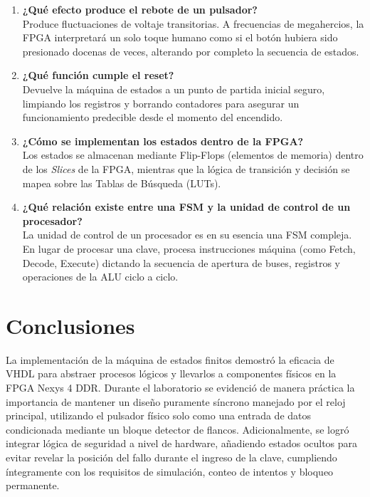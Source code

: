 \documentclass[letterpaper,12pt]{article}
\begin{document}
\begin{enumerate}
    \item \textbf{¿Qué efecto produce el rebote de un pulsador?}\\
    Produce fluctuaciones de voltaje transitorias. A frecuencias de megahercios, la FPGA interpretará un solo toque humano como si el botón hubiera sido presionado docenas de veces, alterando por completo la secuencia de estados.
    
    \item \textbf{¿Qué función cumple el reset?}\\
    Devuelve la máquina de estados a un punto de partida inicial seguro, limpiando los registros y borrando contadores para asegurar un funcionamiento predecible desde el momento del encendido.
    
    \item \textbf{¿Cómo se implementan los estados dentro de la FPGA?}\\
    Los estados se almacenan mediante Flip-Flops (elementos de memoria) dentro de los \textit{Slices} de la FPGA, mientras que la lógica de transición y decisión se mapea sobre las Tablas de Búsqueda (LUTs).
    
    \item \textbf{¿Qué relación existe entre una FSM y la unidad de control de un procesador?}\\
    La unidad de control de un procesador es en su esencia una FSM compleja. En lugar de procesar una clave, procesa instrucciones máquina (como Fetch, Decode, Execute) dictando la secuencia de apertura de buses, registros y operaciones de la ALU ciclo a ciclo.
\end{enumerate}

\section{Conclusiones}
La implementación de la máquina de estados finitos demostró la eficacia de VHDL para abstraer procesos lógicos y llevarlos a componentes físicos en la FPGA Nexys 4 DDR. Durante el laboratorio se evidenció de manera práctica la importancia de mantener un diseño puramente síncrono manejado por el reloj principal, utilizando el pulsador físico solo como una entrada de datos condicionada mediante un bloque detector de flancos. Adicionalmente, se logró integrar lógica de seguridad a nivel de hardware, añadiendo estados ocultos para evitar revelar la posición del fallo durante el ingreso de la clave, cumpliendo íntegramente con los requisitos de simulación, conteo de intentos y bloqueo permanente.
\end{document}
